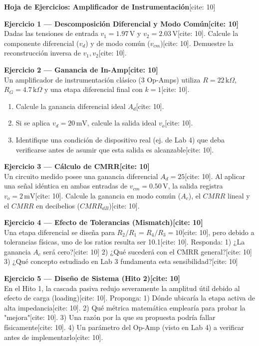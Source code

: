 \documentclass[11pt, a4paper]{article}
\begin{document}
\begin{center}
    \Large\textbf{\textcolor{ucbblue}{Hoja de Ejercicios: Amplificador de Instrumentación}}[cite: 10]
\end{center}

\textbf{Ejercicio 1 — Descomposición Diferencial y Modo Común[cite: 10]} \\
Dadas las tensiones de entrada $v_1 = 1.97\,\text{V}$ y $v_2 = 2.03\,\text{V}$[cite: 10].
Calcule la componente diferencial ($v_d$) y de modo común ($v_{cm}$)[cite: 10]. Demuestre la reconstrucción inversa de $v_1, v_2$[cite: 10].

\vspace{2.5cm}
\textbf{Ejercicio 2 — Ganancia de In-Amp[cite: 10]} \\
Un amplificador de instrumentación clásico (3 Op-Amps) utiliza $R = 22\,\text{k}\Omega$, $R_G = 4.7\,\text{k}\Omega$ y una etapa diferencial final con $k=1$[cite: 10].
\begin{enumerate}
    \item Calcule la ganancia diferencial ideal $A_d$[cite: 10].
    \item Si se aplica $v_d = 20\,\text{mV}$, calcule la salida ideal $v_o$[cite: 10].
    \item Identifique una condición de dispositivo real (ej. de Lab 4) que deba verificarse antes de asumir que esta salida es alcanzable[cite: 10].
\end{enumerate}

\vspace{3.5cm}
\textbf{Ejercicio 3 — Cálculo de CMRR[cite: 10]} \\
Un circuito medido posee una ganancia diferencial $A_d = 25$[cite: 10]. Al aplicar una señal idéntica en ambas entradas de $v_{cm} = 0.50\,\text{V}$, la salida registra $v_o = 2\,\text{mV}$[cite: 10]. Calcule la ganancia en modo común ($A_c$), el $CMRR$ lineal y el $CMRR$ en decibelios ($CMRR_{dB}$)[cite: 10].

\vspace{3cm}
\textbf{Ejercicio 4 — Efecto de Tolerancias (Mismatch)[cite: 10]} \\
Una etapa diferencial se diseña para $R_2/R_1 = R_4/R_3 = 10$[cite: 10], pero debido a tolerancias físicas, uno de los ratios resulta ser 10.1[cite: 10].
Responda: 1) ¿La ganancia $A_c$ será cero?[cite: 10] 2) ¿Qué sucederá con el CMRR general?[cite: 10] 3) ¿Qué concepto estudiado en Lab 3 fundamenta esta sensibilidad?[cite: 10]

\vspace{2cm}
\textbf{Ejercicio 5 — Diseño de Sistema (Hito 2)[cite: 10]} \\
En el Hito 1, la cascada pasiva redujo severamente la amplitud útil debido al efecto de carga (loading)[cite: 10].
Proponga: 1) Dónde ubicaría la etapa activa de alta impedancia[cite: 10]. 2) Qué métrica matemática emplearía para probar la "mejora"[cite: 10]. 3) Una razón por la que su propuesta podría fallar físicamente[cite: 10]. 4) Un parámetro del Op-Amp (visto en Lab 4) a verificar antes de implementarlo[cite: 10].
\end{document}
